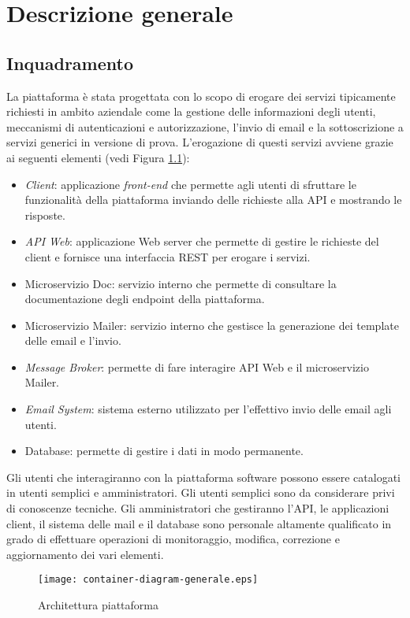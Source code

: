 \chapter{Descrizione generale}

\section{Inquadramento}
La piattaforma è stata progettata con lo scopo di erogare dei servizi tipicamente richiesti in ambito aziendale come la gestione delle
informazioni degli utenti, meccanismi di autenticazioni e autorizzazione, l'invio di
email e la sottoscrizione a servizi generici in versione di prova.
L'erogazione di questi servizi avviene grazie ai seguenti elementi (vedi Figura \ref{fig:Piattaforma}):
\begin{itemize}
    \itemsep0em
    \item \textit{Client}: applicazione \textit{front-end} che permette agli utenti di sfruttare le funzionalità della piattaforma inviando delle richieste alla API e mostrando le risposte.
    \item \textit{API Web}: applicazione Web server che permette di gestire le richieste del client e fornisce una interfaccia REST per erogare i servizi.
    \item Microservizio Doc: servizio interno che permette di consultare la documentazione degli endpoint della piattaforma.
    \item Microservizio Mailer: servizio interno che gestisce la generazione dei template delle email e l'invio.
    \item \textit{Message Broker}: permette di fare interagire API Web e il microservizio Mailer.
    \item \textit{Email System}: sistema esterno utilizzato per l'effettivo invio delle email agli utenti.
    \item Database: permette di gestire i dati in modo permanente.
\end{itemize}

Gli utenti che interagiranno con la piattaforma software possono essere catalogati in utenti semplici e amministratori.
Gli utenti semplici sono da considerare privi di conoscenze tecniche. Gli amministratori che gestiranno l’API, le applicazioni client, il sistema delle mail e il database
sono personale altamente qualificato in grado di effettuare operazioni di monitoraggio, modifica, correzione e aggiornamento dei vari elementi.

\begin{figure}[H]
    \centering
    \texttt{[image: container-diagram-generale.eps]}
    \caption{Architettura piattaforma}
    \label{fig:Piattaforma}
\end{figure}

